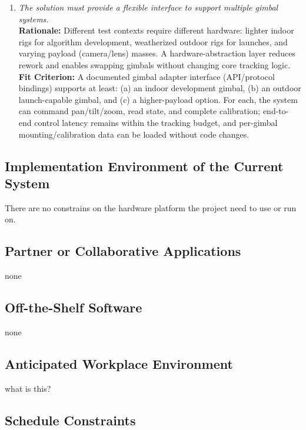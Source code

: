 \documentclass[12pt]{article}
\begin{document}
\begin{enumerate}[label=MD-SL \arabic*., wide=0pt, leftmargin=*]
  \item \emph{The solution must provide a flexible interface to support multiple gimbal systems.}\\[2mm]
        {\bf Rationale:} Different test contexts require different hardware: lighter indoor rigs for algorithm development, weatherized outdoor rigs for launches, and varying payload (camera/lens) masses. A hardware-abstraction layer reduces rework and enables swapping gimbals without changing core tracking logic.\\
        {\bf Fit Criterion:} A documented gimbal adapter interface (API/protocol bindings) supports at least: (a) an indoor development gimbal, (b) an outdoor launch-capable gimbal, and (c) a higher-payload option. For each, the system can command pan/tilt/zoom, read state, and complete calibration; end-to-end control latency remains within the tracking budget, and per-gimbal mounting/calibration data can be loaded without code changes.
\end{enumerate}

\subsection{Implementation Environment of the Current System}

There are no constrains on the hardware platform the project need to use or run
on.

\subsection{Partner or Collaborative Applications}

none

\subsection{Off-the-Shelf Software}

none

\subsection{Anticipated Workplace Environment}

what is this?

\subsection{Schedule Constraints}
\end{document}
